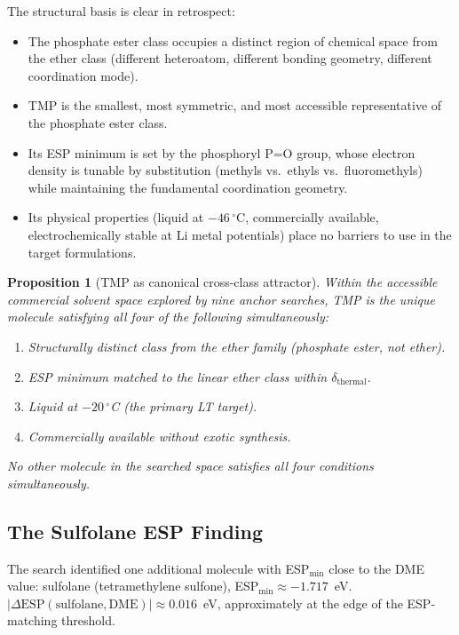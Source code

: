 \documentclass[11pt]{article}
\theoremstyle{plain}
\newtheorem{proposition}[theorem]{Proposition}
\theoremstyle{definition}
\theoremstyle{remark}
\begin{document}
The structural basis is clear in retrospect:
\begin{itemize}[leftmargin=2em]
  \item The phosphate ester class occupies a distinct region of chemical
        space from the ether class (different heteroatom, different bonding
        geometry, different coordination mode).
  \item TMP is the smallest, most symmetric, and most accessible
        representative of the phosphate ester class.
  \item Its ESP minimum is set by the phosphoryl P=O group, whose electron
        density is tunable by substitution (methyls vs.\ ethyls vs.\
        fluoromethyls) while maintaining the fundamental coordination
        geometry.
  \item Its physical properties (liquid at $-46\,^\circ$C, commercially
        available, electrochemically stable at Li metal potentials) place
        no barriers to use in the target formulations.
\end{itemize}

\begin{proposition}[TMP as canonical cross-class attractor]
Within the accessible commercial solvent space explored by nine
anchor searches, TMP is the unique molecule satisfying all four
of the following simultaneously:
\begin{enumerate}[label=(\roman*)]
  \item Structurally distinct class from the ether family
        (phosphate ester, not ether).
  \item ESP minimum matched to the linear ether class within
        $\delta_{\mathrm{thermal}}$.
  \item Liquid at $-20\,^\circ$C (the primary LT target).
  \item Commercially available without exotic synthesis.
\end{enumerate}
No other molecule in the searched space satisfies all four conditions
simultaneously.
\end{proposition}

\subsection{The Sulfolane ESP Finding}

The search identified one additional molecule with ESP$_{\min}$ close to
the DME value: sulfolane (tetramethylene sulfone),
ESP$_{\min} \approx -1.717$~eV.  $|\Delta\mathrm{ESP}(\mathrm{sulfolane,
DME})| \approx 0.016$~eV, approximately at the edge of the ESP-matching
threshold.
\end{document}
